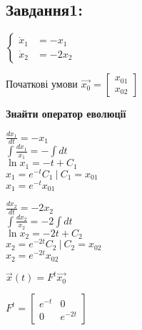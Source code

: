 \subsection{Завдання1:}
$\left\{\begin{aligned}
    \dot{x}_1 &= -x_1 \\
    \dot{x}_2 &= -2x_2
\end{aligned}\right.$

Початкові умови $\overrightarrow{x_0} = \begin{bmatrix} x_{01} \\ x_{02} \end{bmatrix}$

\textbf{Знайти оператор еволюції}



\begin{minipage}{0.3\textwidth}
    $\frac{dx_1}{dt} = -x_1$\\[1.5mm]
    $\int \frac{dx_1}{x_1} = -\int dt$\\[1.5mm]
    $\ln x_1 = -t + C_1$\\[1.5mm]
    $x_1 = e^{-t}C_1 \ |\ C_1 = x_{01}$\\[1.5mm] 
    $x_1 = e^{-t}x_{01}$
\end{minipage}
\begin{minipage}{0.49\textwidth}
    $\frac{dx_2}{dt} = -2x_2$\\[1.5mm]
    $\int \frac{dx_2}{x_2} = -2\int dt$\\[1.5mm]
    $\ln x_2 = -2t + C_2$\\[1.5mm]
    $x_2 = e^{-2t}C_2 \ |\ C_2 = x_{02}$\\[1.5mm] 
    $x_2 = e^{-2t}x_{02}$
\end{minipage}

$\overrightarrow{x}(t) = F^t\overrightarrow{x_0}$

$F^t = \begin{bmatrix}
    e^{-t} & 0 \\
    0 & e^{-2t}
\end{bmatrix}$

